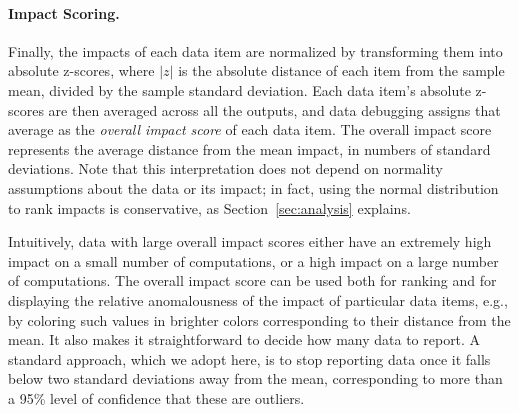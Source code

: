 \paragraph{Impact Scoring.}
Finally, the impacts of each data item are normalized by transforming
them into absolute z-scores, where $|z|$ is the absolute distance of
each item from the sample mean, divided by the sample standard
deviation. Each data item's absolute z-scores are then averaged across
all the outputs, and data debugging assigns that average as the
\emph{overall impact score} of each data item. The overall impact
score represents the average distance from the mean impact, in numbers
of standard deviations. Note that this interpretation does not depend
on normality assumptions about the data or its impact; in fact, using
the normal distribution to rank impacts is conservative, as
Section~\ref{sec:analysis} explains.

Intuitively, data with large overall impact scores either have an
extremely high impact on a small number of computations, or a high
impact on a large number of computations. The overall impact score can
be used both for ranking and for displaying the relative anomalousness
of the impact of particular data items, e.g., by coloring such values
in brighter colors corresponding to their distance from the mean. It
also makes it straightforward to decide how many data to report. A
standard approach, which we adopt here, is to stop reporting data once
it falls below two standard deviations away from the mean,
corresponding to more than a 95\% level of confidence that these are
outliers.




